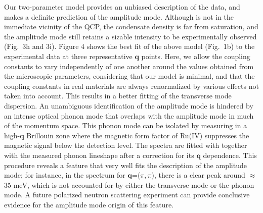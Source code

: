 Our two-parameter model provides an unbiased description of the data, and makes a definite prediction of the amplitude mode. Although \CRO is not in the immediate vicinity of the QCP, the condensate density is far from saturation, and the amplitude mode still retains a sizable intensity to be experimentally observed (Fig.~3h and 3i). Figure 4 shows the best fit of the above model (Fig.~1b) to the experimental data at three representative $\mathbf{q}$ points. Here, we allow the coupling constants to vary independently of one another around the values obtained from the microscopic parameters, considering that our model is minimal, and that the coupling constants in real materials are always renormalized by various effects not taken into account. This results in a better fitting of the transverse mode dispersion. An unambiguous identification of the amplitude mode is hindered by an intense optical phonon mode that overlaps with the amplitude mode in much of the momentum space. This phonon mode can be isolated by measuring in a high-$\mathbf{q}$ Brillouin zone where the magnetic form factor of Ru(IV) suppresses the magnetic signal below the detection level. The spectra are fitted with together with the measured phonon lineshape after a correction for its ${\mathbf q}$ dependence. This procedure reveals  a feature that very well fits the description of the amplitude mode; for instance, in the spectrum for $\mathbf{q}$=($\pi,\pi$), there is a clear peak around $\approx$35 meV, which is not accounted for by either the transverse mode or the phonon mode. A future polarized neutron scattering experiment can provide conclusive evidence for the amplitude mode origin of this feature.